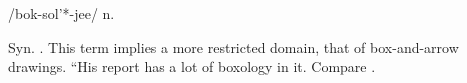  /bok-sol'*-jee/ n.

Syn. . This term implies a more restricted domain, that of
box-and-arrow drawings. ``His report has a lot of boxology in it. Compare
.

